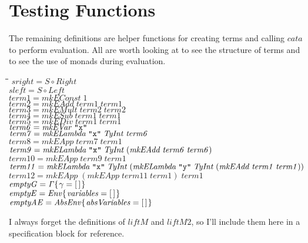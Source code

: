\documentclass[10pt]{article}
\newlength{\lwidth}\setlength{\lwidth}{4.5cm}
\newlength{\cwidth}\setlength{\cwidth}{8mm} %
\newcommand{\Conid}[1]{\mathit{#1}}
\newcommand{\Varid}[1]{\mathit{#1}}
\begin{document}
\section{Testing Functions}

The remaining definitions are helper functions for creating terms and
calling \ensuremath{\Varid{cata}} to perform evaluation.  All are worth looking at to see
the structure of terms and to see the use of monads during evaluation.

\begin{tabbing}
\qquad\=\hspace{\lwidth}\=\hspace{\cwidth}\=\+\kill
${\Varid{sright}\mathrel{=}\Conid{S}\mathbin{\circ}\Conid{Right}}$\\
${}$\\
${\Varid{sleft}\mathrel{=}\Conid{S}\mathbin{\circ}\Conid{Left}}$\\
${}$\\
${\Varid{term1}\mathrel{=}\Varid{mkEConst}\;\mathrm{1}}$\\
${\Varid{term2}\mathrel{=}\Varid{mkEAdd}\;\Varid{term1}\;\Varid{term1}}$\\
${\Varid{term3}\mathrel{=}\Varid{mkEMult}\;\Varid{term2}\;\Varid{term2}}$\\
${\Varid{term4}\mathrel{=}\Varid{mkESub}\;\Varid{term1}\;\Varid{term1}}$\\
${\Varid{term5}\mathrel{=}\Varid{mkEDiv}\;\Varid{term1}\;\Varid{term1}}$\\
${\Varid{term6}\mathrel{=}\Varid{mkEVar}\;\text{\tt \char34 x\char34}}$\\
${\Varid{term7}\mathrel{=}\Varid{mkELambda}\;\text{\tt \char34 x\char34}\;\Conid{TyInt}\;\Varid{term6}}$\\
${\Varid{term8}\mathrel{=}\Varid{mkEApp}\;\Varid{term7}\;\Varid{term1}}$\\
${\Varid{term9}\mathrel{=}\Varid{mkELambda}\;\text{\tt \char34 x\char34}\;\Conid{TyInt}\;(\Varid{mkEAdd}\;\Varid{term6}\;\Varid{term6})}$\\
${\Varid{term10}\mathrel{=}\Varid{mkEApp}\;\Varid{term9}\;\Varid{term1}}$\\
${\Varid{term11}\mathrel{=}\Varid{mkELambda}\;\text{\tt \char34 x\char34}\;\Conid{TyInt}\;(\Varid{mkELambda}\;\text{\tt \char34 y\char34}\;\Conid{TyInt}\;(\Varid{mkEAdd}\;\Varid{term1}\;\Varid{term1}))}$\\
${\Varid{term12}\mathrel{=}\Varid{mkEApp}\;(\Varid{mkEApp}\;\Varid{term11}\;\Varid{term1})\;\Varid{term1}}$\\
${}$\\
${\Varid{emptyG}\mathrel{=}\Varid{\Gamma}\{\mskip1.5mu \Varid{\gamma}\mathrel{=}[\mskip1.5mu \mskip1.5mu]\mskip1.5mu\}}$\\
${\Varid{emptyE}\mathrel{=}\Conid{Env}\{\mskip1.5mu \Varid{variables}\mathrel{=}[\mskip1.5mu \mskip1.5mu]\mskip1.5mu\}}$\\
${\Varid{emptyAE}\mathrel{=}\Conid{AbsEnv}\{\mskip1.5mu \Varid{absVariables}\mathrel{=}[\mskip1.5mu \mskip1.5mu]\mskip1.5mu\}}$
\end{tabbing}
I always forget the definitions of \ensuremath{\Varid{liftM}} and \ensuremath{\Varid{liftM2}}, so I'll
include them here in a specification block for reference.
\end{document}

